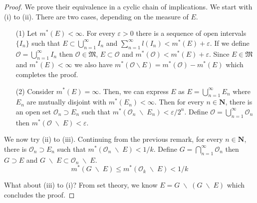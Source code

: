 \vspace{2ex}
\begin{proof}
We prove their equivalence in a cyclic chain of implications. We start with (i) to (ii). There are two cases, depending on the measure of $E$.
\begin{itemize}
\item[(1)] Let $m^{*}(E)<\infty $. For every $\varepsilon >0$ there is a sequence of open intervals $\{I_{n}\}$ such that $E\subset \bigcup ^{\infty }_{n=1}I_{n}$ and $\sum ^{\infty }_{n=1}l(I_{n})<m^{*}(E)+\varepsilon $. If we define $\mathcal{O}=\bigcup ^{\infty }_{n=1}I_{n}$ then $\mathcal{O}\in \mathfrak{M}$, $E\subset \mathcal{O}$ and $m^{*}(\mathcal{O})<m^{*}(E)+\varepsilon $. Since $E\in \mathfrak{M}$ and $m^{*}(E)<\infty $ we also have $m^{*}(\mathcal{O}\backslash E)=m^{*}(\mathcal{O})-m^{*}(E)$ which completes the proof.
\item[(2)] Consider $m^{*}(E)=\infty $. Then, we can express $E$ as $E=\bigcup ^{\infty }_{n=1}E_{n}$ where $E_{n}$ are mutually disjoint with $m^{*}(E_{n})<\infty $. Then for every $n\in {\bm N}$, there is an open set $\mathcal{O}_{n}\supset E_{n}$ such that $m^{*}(\mathcal{O}_{n}\;\backslash\; E_{n})<\varepsilon /2^{n}$. Define $\mathcal{O}=\bigcup ^{\infty }_{n=1}\mathcal{O}_{n}$ then $m^{*}(\mathcal{O}\;\backslash\; E)<\varepsilon $.
\end{itemize}
We now try (ii) to (iii). Continuing from the previous remark, for every $n\in {\bm N}$, there is $\mathcal{O}_{n}\supset E_{n}$ such that $m^{*}(\mathcal{O}_{n}\;\backslash\; E)<1/k$. Define $G=\bigcap ^{\infty }_{n=1}\mathcal{O}_{n}$ then $G\supset E$ and $G\;\backslash\; E\subset \mathcal{O}_{n}\;\backslash\; E$.
	\[m^{*}(G\;\backslash\;E)\leq m^{*}(\mathcal{O}_{k}\;\backslash\;E)<1/k\]

What about (iii) to (i)? From set theory, we know $E=G\;\backslash\; (G\;\backslash\;E)$ which concludes the proof.
\end{proof}
\vspace{2ex}


